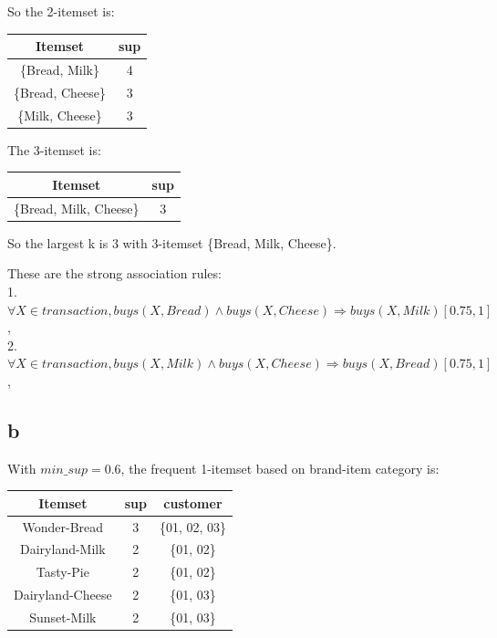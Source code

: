 \documentclass[]{article}
\begin{document}
So the 2-itemset is: \\
\begin{table}[!ht]
    \begin{tabular}{c c }
        \hline 
        \textbf{Itemset} & \textbf{sup} \\
        \hline
        \{Bread, Milk\} & 4 \\
        \{Bread, Cheese\} & 3 \\
        \{Milk, Cheese\} & 3 \\
        \hline
    \end{tabular}
\end{table}

The 3-itemset is: \\
\begin{table}[!ht]
    \begin{tabular}{c c }
        \hline 
        \textbf{Itemset} & \textbf{sup} \\
        \hline
        \{Bread, Milk, Cheese\} & 3 \\
        \hline
    \end{tabular}
\end{table}

So the largest k is 3 with 3-itemset \{Bread, Milk, Cheese\}. 

These are the strong association rules:\\
1. $\forall X\in transaction, buys(X,Bread)\wedge buys(X,Cheese)\Rightarrow buys(X, Milk)[0.75,1]$, \\
2. $\forall X\in transaction, buys(X,Milk)\wedge buys(X,Cheese)\Rightarrow buys(X, Bread)[0.75,1]$, \\


\subsection*{b}
With $min\_sup=0.6$, the frequent 1-itemset based on brand-item category is: \\
\begin{table}[!ht]
    \begin{tabular}{c c c}
        \hline 
        \textbf{Itemset} & \textbf{sup} & \textbf{customer}\\
        \hline
        Wonder-Bread & 3 & \{01, 02, 03\} \\
        Dairyland-Milk & 2 & \{01, 02\} \\
        Tasty-Pie & 2 & \{01, 02\} \\
        Dairyland-Cheese & 2 & \{01, 03\} \\
        Sunset-Milk & 2 & \{01, 03\}\\
        \hline
    \end{tabular}
\end{table}
\end{document}
